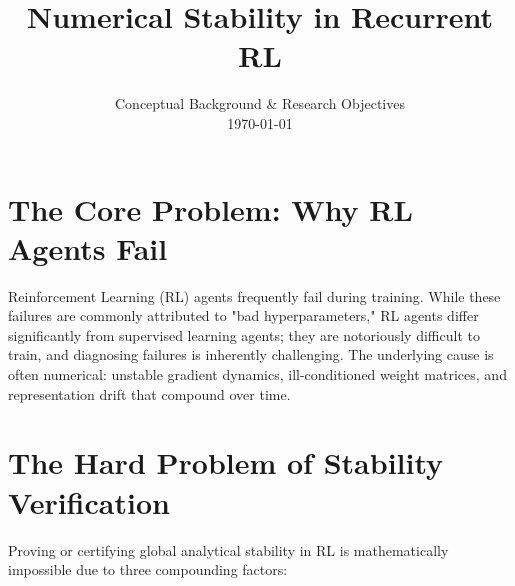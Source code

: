 \documentclass[11pt,a4paper]{article}
\title{\textbf{ Numerical Stability in Recurrent RL}}
\date{Conceptual Background \& Research Objectives \\ \vspace{0.5em} \today}
\begin{document}
\maketitle

\section{The Core Problem: Why RL Agents Fail}
Reinforcement Learning (RL) agents frequently fail during training. While these failures are commonly attributed to "bad hyperparameters," RL agents differ significantly from supervised learning agents; they are notoriously difficult to train, and diagnosing failures is inherently challenging. The underlying cause is often numerical: unstable gradient dynamics, ill-conditioned weight matrices, and representation drift that compound over time.

\section{The Hard Problem of Stability Verification}
Proving or certifying global analytical stability in RL is mathematically impossible due to three compounding factors:
\end{document}

